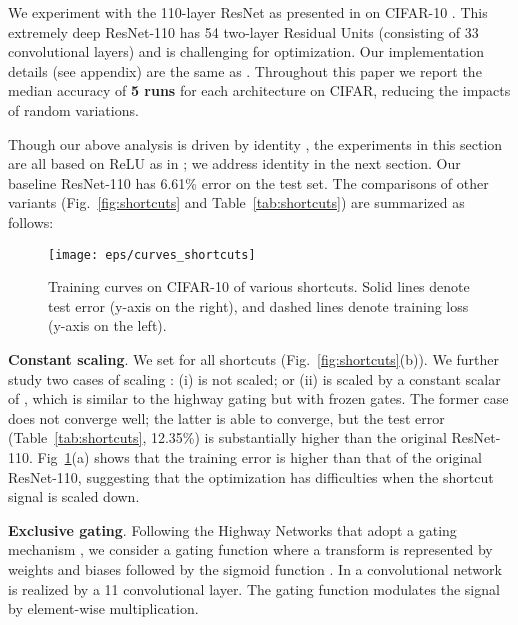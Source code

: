 \documentclass[runningheads]{llncs}
\begin{document}
We experiment with the 110-layer ResNet as presented in \cite{He2016} on CIFAR-10 \cite{Krizhevsky2009}. This extremely deep ResNet-110 has 54 two-layer Residual Units (consisting of 33 convolutional layers) and is challenging for optimization.
Our implementation details (see appendix) are the same as \cite{He2016}. Throughout this paper we report the median accuracy of \textbf{5 runs} for each architecture on CIFAR, reducing the impacts of random variations.

Though our above analysis is driven by identity , the experiments in this section are all based on  ReLU as in \cite{He2016}; we address identity  in the next section.
Our baseline ResNet-110 has 6.61\% error on the test set.
The comparisons of other variants (Fig.~\ref{fig:shortcuts} and Table~\ref{tab:shortcuts}) are summarized as follows:

\begin{figure}[t]
\centering
\texttt{[image: eps/curves\_shortcuts]}
\caption{Training curves on CIFAR-10 of various shortcuts. Solid lines denote test error (y-axis on the right), and dashed lines denote training loss (y-axis on the left).
}
\label{fig:curves_shortcuts}
\end{figure}

\textbf{Constant scaling}. We set  for all shortcuts (Fig.~\ref{fig:shortcuts}(b)). We further study two cases of scaling : (i)  is not scaled; or (ii)  is scaled by a constant scalar of , which is similar to the highway gating \cite{Srivastava2015,Srivastava2015a} but with frozen gates. The former case does not converge well; the latter is able to converge, but the test error (Table~\ref{tab:shortcuts}, 12.35\%) is substantially higher than the original ResNet-110. Fig~\ref{fig:curves_shortcuts}(a) shows that the training error is higher than that of the original ResNet-110, suggesting that the optimization has difficulties when the shortcut signal is scaled down.

\textbf{Exclusive gating}. Following the Highway Networks \cite{Srivastava2015,Srivastava2015a} that adopt a gating mechanism \cite{Hochreiter1997},
we consider a gating function  where a transform is represented by weights  and biases  followed by the sigmoid function . In a convolutional network  is realized by a 11 convolutional layer. The gating function modulates the signal by element-wise multiplication.
\end{document}

